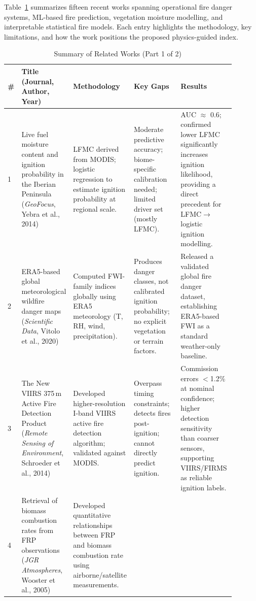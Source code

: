 \documentclass[conference]{IEEEtran}
\begin{document}
Table~\ref{tab:related} summarizes fifteen recent works spanning operational fire
danger systems, ML-based fire prediction, vegetation moisture modelling, and
interpretable statistical fire models. Each entry highlights the methodology,
key limitations, and how the work positions the proposed physics-guided index.

\begin{table}[t]
\caption{Summary of Related Works (Part 1 of 2)}
\label{tab:related}
\centering
\scriptsize
\begin{tabular}{|p{0.02\linewidth}|p{0.21\linewidth}|p{0.21\linewidth}|p{0.21\linewidth}|p{0.24\linewidth}|}
\hline
\textbf{\#} & \textbf{Title (Journal, Author, Year)} & \textbf{Methodology} & \textbf{Key Gaps} & \textbf{Results} \\
\hline
1 &
Live fuel moisture content and ignition probability in the Iberian Peninsula
(\textit{GeoFocus}, Yebra et al., 2014) &
LFMC derived from MODIS; logistic regression to estimate ignition probability at regional scale. &
Moderate predictive accuracy; biome-specific calibration needed; limited driver set (mostly LFMC). &
AUC $\approx$ 0.6; confirmed lower LFMC significantly increases ignition likelihood, providing a direct precedent for LFMC$\rightarrow$logistic ignition modelling. \\
\hline
2 &
ERA5-based global meteorological wildfire danger maps
(\textit{Scientific Data}, Vitolo et al., 2020) &
Computed FWI-family indices globally using ERA5 meteorology (T, RH, wind, precipitation). &
Produces danger classes, not calibrated ignition probability; no explicit vegetation or terrain factors. &
Released a validated global fire danger dataset, establishing ERA5-based FWI as a standard weather-only baseline. \\
\hline
3 &
The New VIIRS 375\,m Active Fire Detection Product
(\textit{Remote Sensing of Environment}, Schroeder et al., 2014) &
Developed higher-resolution I-band VIIRS active fire detection algorithm; validated against MODIS. &
Overpass timing constraints; detects fires post-ignition; cannot directly predict ignition. &
Commission errors $<$1.2\% at nominal confidence; higher detection sensitivity than coarser sensors, supporting VIIRS/FIRMS as reliable ignition labels. \\
\hline
4 &
Retrieval of biomass combustion rates from FRP observations
(\textit{JGR Atmospheres}, Wooster et al., 2005) &
Developed quantitative relationships between FRP and biomass combustion rate using airborne/satellite measurements. &

\end{tabular}
\end{table}
\end{document}
